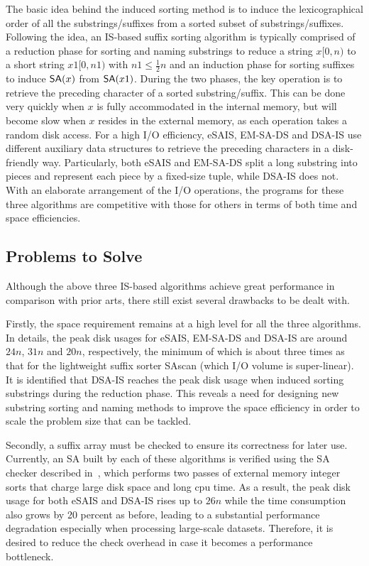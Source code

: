 \documentclass[10pt,journal,compsoc]{IEEEtran}
\begin{document}
The basic idea behind the induced sorting method is to induce the lexicographical order of all the substrings/suffixes from a sorted subset of substrings/suffixes. Following the idea, an IS-based suffix sorting algorithm is typically comprised of a reduction phase for sorting and naming substrings to reduce a string $x[0,n)$ to a short string $x1[0,n1)$ with $n1 \le \frac{1}{2}n$ and an induction phase for sorting suffixes to induce ${\sf SA}(x)$ from ${\sf SA}(x1)$. During the two phases, the key operation is to retrieve the preceding character of a sorted substring/suffix. This can be done very quickly when $x$ is fully accommodated in the internal memory, but will become slow when $x$ resides in the external memory, as each operation takes a random disk access. For a high I/O efficiency, eSAIS, EM-SA-DS and DSA-IS use different auxiliary data structures to retrieve the preceding characters in a disk-friendly way. Particularly, both eSAIS and EM-SA-DS split a long substring into pieces and represent each piece by a fixed-size tuple, while DSA-IS does not. With an elaborate arrangement of the I/O operations, the programs for these three algorithms are competitive with those for others in terms of both time and space efficiencies.

\subsection{Problems to Solve}
Although the above three IS-based algorithms achieve great performance in comparison with prior arts, there still exist several drawbacks to be dealt with.

Firstly, the space requirement remains at a high level for all the three algorithms. In details, the peak disk usages for eSAIS, EM-SA-DS and DSA-IS are around $24n$, $31n$ and $20n$, respectively, the minimum of which is about three times as that for the lightweight suffix sorter SAscan (which I/O volume is super-linear). It is identified that DSA-IS reaches the peak disk usage when induced sorting substrings during the reduction phase. This reveals a need for designing new substring sorting and naming methods to improve the space efficiency in order to scale the problem size that can be tackled.

Secondly, a suffix array must be checked to ensure its correctness for later use. Currently, an SA built by each of these algorithms is verified using the SA checker described in~\cite{Karkkainen2003}, which performs two passes of external memory integer sorts that charge large disk space and long cpu time. As a result, the peak disk usage for both eSAIS and DSA-IS rises up to $26n$ while the time consumption also grows by 20 percent as before, leading to a substantial performance degradation especially when processing large-scale datasets. Therefore, it is desired to reduce the check overhead in case it becomes a performance bottleneck.
\end{document}
